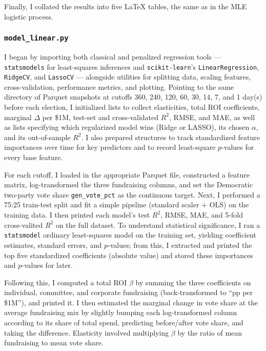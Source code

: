 Finally, I collated the results into five LaTeX tables, the same as in the MLE logistic process.

\subsubsection*{\tt model\_linear.py}

I began by importing both classical and penalized regression tools --- {\tt statsmodels} for least-squares inferences and {\tt scikit-learn}'s {\tt LinearRegression}, {\tt RidgeCV}, and {\tt LassoCV} --- alongside utilities for splitting data, scaling features, cross-validation, performance metrics, and plotting. Pointing to the same directory of Parquet snapshots at cutoffs 360, 240, 120, 60, 30, 14, 7, and 1 day(s) before each election, I initialized lists to collect elasticities, total ROI coefficients, marginal $\Delta$ per \$1M, test-set and cross-validated $R^2$, RMSE, and MAE, as well as lists specifying which regularized model wins (Ridge or LASSO), its chosen $\alpha$, and its out-of-sample $R^2$. I also prepared structures to track standardized feature importances over time for key predictors and to record least-square $p$-values for every base feature.

For each cutoff, I loaded in the appropriate Parquet file, constructed a feature matrix, log-transformed the three fundraising columns, and set the Democratic two-party vote share {\tt gen\_vote\_pct} as the continuous target. Next, I performed a 75:25 train-test split and fit a simple pipeline (standard scaler $+$ OLS) on the training data. I then printed each model's test $R^2$, RMSE, MAE, and 5-fold cross-valited $R^2$ on the full dataset. To understand statistical significance, I ran a {\tt statsmodel} ordinary least-squares model on the training set, yielding coefficient estimates, standard errors, and $p$-values; from this, I extracted and printed the top five standardized coefficients (absolute value) and stored these importances and $p$-values for later.

Following this, I computed a total ROI $\beta$ by summing the three coefficients on individual, committee, and corporate fundraising (back-transformed to ``pp per \$1M''), and printed it. I then estimated the marginal change in vote share at the average fundraising mix by slightly bumping each log-transformed column according to its share of total spend, predicting before/after vote share, and taking the difference. Elasticity involved multiplying $\beta$ by the ratio of mean fundraising to mean vote share.

